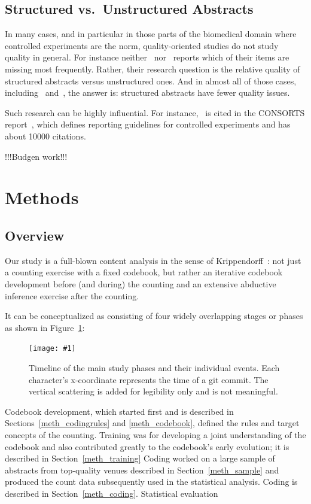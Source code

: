 \documentclass[10pt,journal,compsoc]{IEEEtran}
\newcommand{\Plot}[2]{%
	\begin{figure}[!t]%
		\centering\texttt{[image: \#1]}%
		\vspace{-4mm}\caption{#2}\label{#1}%
	\end{figure}}
\begin{document}
\subsection{Structured vs.\ Unstructured Abstracts}

In many cases, and in particular in those parts of the biomedical domain 
where controlled experiments are the norm, quality-oriented studies do not study
quality in general.
For instance neither~\cite{DupKhoLeb03} nor~\cite{ShaHar06} reports
which of their items are missing most frequently.
Rather, their research question is the relative quality of structured abstracts
versus unstructured ones. 
And in almost all of those cases, including~\cite{DupKhoLeb03} and~\cite{ShaHar06},
the answer is: structured abstracts have fewer quality issues.

Such research can be highly influential.
For instance,~\cite{HarSydBlu96} 
is cited in the CONSORTS report~\cite{MohHopSch12},
which defines reporting guidelines for controlled experiments and has about
10000 citations.

!!!Budgen work!!!


\section{Methods}


\subsection{Overview}

Our study is a full-blown content analysis in the sense of Krippendorff~\cite{Krippendorff04}:
not just a counting exercise with a fixed codebook, 
but rather an iterative codebook development before (and during) the counting
and an extensive abductive inference exercise after the counting.

It can be conceptualized as consisting of four widely overlapping stages or phases
as shown in Figure~\ref{qabstracts_timeline_commits}:
%
\Plot{qabstracts_timeline_commits}{%
	Timeline of the main study phases and their individual events.
    Each character's x-coordinate represents the time of a git commit.
    The vertical scattering is added for legibility only and is not meaningful.}
%
Codebook development, which started first and is described in Sections~\ref{meth_codingrules}
and \ref{meth_codebook},
defined the rules and target concepts of the counting.
Training was for developing a joint understanding of the codebook and also contributed
greatly to the codebook's early evolution;  
it is described in Section~\ref{meth_training}
Coding worked on a large sample of abstracts from top-quality venues described in 
Section~\ref{meth_sample} and produced the count data subsequently used in the statistical analysis.
Coding is described in Section~\ref{meth_coding}.
Statistical evaluation 
\end{document}
